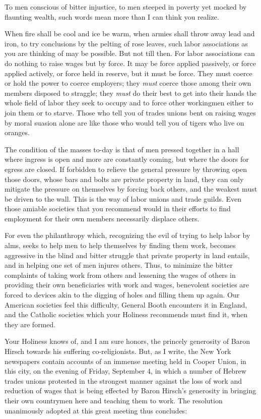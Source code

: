 \documentclass{book}
\begin{document}
To men conscious of bitter injustice, to men steeped in poverty yet mocked by flaunting wealth, such words mean more than I can think you realize.

When fire shall be cool and ice be warm, when armies shall throw away lead and iron, to try conclusions by the pelting of rose leaves, such labor associations as you are thinking of may be possible. But not till then. For labor associations can do nothing to raise wages but by force. It may be force applied passively, or force applied actively, or force held in reserve, but it must be force. They must coerce or hold the power to coerce employers; they \emph{must} coerce those among their own members disposed to straggle; they \emph{must} do their best to get into their hands the whole field of labor they seek to occupy and to force other workingmen either to join them or to starve. Those who tell you of trades unions bent on raising wages by moral suasion alone are like those who would tell you of tigers who live on oranges.

The condition of the masses to-day is that of men pressed together in a hall where ingress is open and more are constantly coming, but where the doors for egress are closed. If forbidden to relieve the general pressure by throwing open those doors, whose bars and bolts are private property in land, they can only mitigate the pressure on themselves by forcing back others, and the weakest must be driven to the wall. This is the way of labor unions and trade guilds. Even those amiable societies that you recommend would in their efforts to find employment for their own members necessarily displace others.

For even the philanthropy which, recognizing the evil of trying to help labor by alms, seeks to help men to help themselves by finding them work, becomes aggressive in the blind and bitter struggle that private property in land entails, and in helping one set of men injures others. Thus, to minimize the bitter complaints of taking work from others and lessening the wages of others in providing their own beneficiaries with work and wages, benevolent societies are forced to devices akin to the digging of holes and filling them up again. Our American societies feel this difficulty, General Booth encounters it in England, and the Catholic societies which your Holiness recommends must find it, when they are formed.

Your Holiness knows of, and I am sure honors, the princely generosity of Baron Hirsch towards his suffering co-religionists. But, as I write, the New York newspapers contain accounts of an immense meeting held in Cooper Union, in this city, on the evening of Friday, September 4, in which a number of Hebrew trades unions protested in the strongest manner against the loss of work and reduction of wages that is being effected by Baron Hirsch’s generosity in bringing their own countrymen here and teaching them to work. The resolution unanimously adopted at this great meeting thus concludes:
\end{document}

